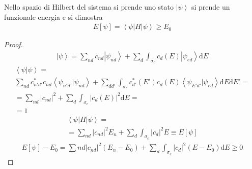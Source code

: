 Nello spazio di Hilbert del sistema si prende uno stato $\left |\psi  \right\rangle$ si prende un funzionale energia e si dimostra
\begin{equation}\begin{split}
E\left[\psi \right]=\left\langle \psi |H|\psi  \right\rangle\ge E_0
\end{split}\end{equation}
\begin{proof}
\begin{equation}\begin{split}
\left |\psi  \right\rangle=\sum_{nd}{c_{nd}\left |\psi _{nd} \right\rangle}+\sum_d{\int_{\sigma_c}c_d\left(E\right)\left |\psi _{ed} \right\rangle\textrm{d}E}
\end{split}\end{equation}
\begin{equation}\begin{split}
\left\langle \psi |\psi  \right\rangle=\\
\sum_{nd}{c^*_{n'd'}c_{nd}\left\langle \psi _{n'd'}|\psi _{nd} \right\rangle}+\sum_{dd'}{\int_{\sigma_c}c^*_{d'}\left(E'\right)c_d\left(E\right)\left\langle \psi _{E'd'}|\psi _{ed} \right\rangle\textrm{d}E}\textrm{d}E'=\\
=\sum_{nd}{|c_{nd}|^2}+\sum_d{\int_{\sigma_c}{|c_d\left(E\right)|^2\textrm{d}E}} =\\
=1
\end{split}\end{equation}
\begin{equation}\begin{split}
\left\langle \psi |H|\psi  \right\rangle=\\
=\sum_{nd}{|c_{nd}|^2E_n}+\sum_d{\int_{\sigma_c}|c_d|^2E}\equiv E\left[\psi \right]
\end{split}\end{equation}
\begin{equation}\begin{split}
E\left[\psi \right]-E_0=\sum{nd}{|c_{nd}|^2\left(E_n-E_0\right)}+\sum_{d}{\int_{\sigma_c}{|c_d|^2\left(E-E_0\right)\textrm{d}E}}\ge 0
\end{split}\end{equation}
\end{proof}


